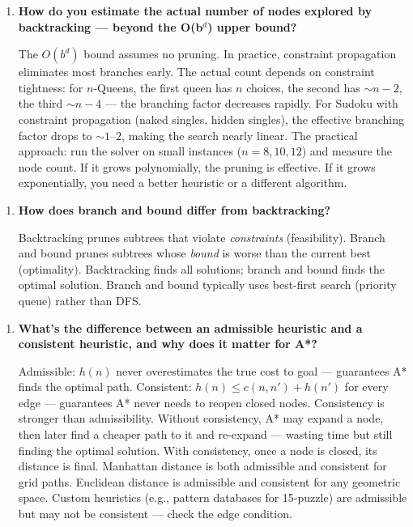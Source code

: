 \begin{enumerate}
\item \textbf{How do you estimate the actual number of nodes explored by backtracking --- beyond the O(b$^{d}$) upper bound?}

The $O(b^{d})$ bound assumes no pruning. In practice, constraint propagation eliminates most branches early. The actual count depends on constraint tightness: for $n$-Queens, the first queen has $n$ choices, the second has $\sim n{-}2$, the third $\sim n{-}4$ --- the branching factor decreases rapidly. For Sudoku with constraint propagation (naked singles, hidden singles), the effective branching factor drops to $\sim 1$--$2$, making the search nearly linear. The practical approach: run the solver on small instances ($n = 8, 10, 12$) and measure the node count. If it grows polynomially, the pruning is effective. If it grows exponentially, you need a better heuristic or a different algorithm.
\end{enumerate}

\begin{enumerate}
\item \textbf{How does branch and bound differ from backtracking?}

Backtracking prunes subtrees that violate \textit{constraints} (feasibility). Branch and bound prunes subtrees whose \textit{bound} is worse than the current best (optimality). Backtracking finds all solutions; branch and bound finds the optimal solution. Branch and bound typically uses best-first search (priority queue) rather than DFS.
\end{enumerate}

\begin{enumerate}
\item \textbf{What's the difference between an admissible heuristic and a consistent heuristic, and why does it matter for A*?}

Admissible: $h(n)$ never overestimates the true cost to goal --- guarantees A* finds the optimal path. Consistent: $h(n) \le c(n, n') + h(n')$ for every edge --- guarantees A* never needs to reopen closed nodes. Consistency is stronger than admissibility. Without consistency, A* may expand a node, then later find a cheaper path to it and re-expand --- wasting time but still finding the optimal solution. With consistency, once a node is closed, its distance is final. Manhattan distance is both admissible and consistent for grid paths. Euclidean distance is admissible and consistent for any geometric space. Custom heuristics (e.g., pattern databases for 15-puzzle) are admissible but may not be consistent --- check the edge condition.
\end{enumerate}

